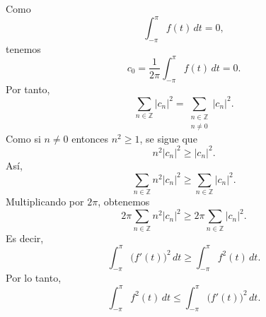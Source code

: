 \documentclass[11pt,letterpaper]{article}
\newcommand{\Z}{\mathbb{Z}}
\begin{document}
Como
\begin{equation*}
    \int_{-\pi}^{\pi}f(t)\,dt=0,
\end{equation*}
tenemos
\begin{equation*}
    c_0=\frac{1}{2\pi}\int_{-\pi}^{\pi}f(t)\,dt=0.
\end{equation*}
Por tanto,
\begin{equation*}
    \sum_{n\in\Z}|c_n|^2
    =\sum_{\substack{n\in\Z\\ n\neq0}}|c_n|^2.
\end{equation*}
Como si $n\neq0$ entonces $n^2\geq1$, se sigue que
\begin{equation*}
    n^2|c_n|^2\geq |c_n|^2.
\end{equation*}
Así,
\begin{equation*}
    \sum_{n\in\Z}n^2|c_n|^2
    \geq
    \sum_{n\in\Z}|c_n|^2.
\end{equation*}
Multiplicando por $2\pi$, obtenemos
\begin{equation*}
    2\pi\sum_{n\in\Z}n^2|c_n|^2
    \geq
    2\pi\sum_{n\in\Z}|c_n|^2.
\end{equation*}
Es decir,
\begin{equation*}
    \int_{-\pi}^{\pi}\bigl(f'(t)\bigr)^2\,dt
    \geq
    \int_{-\pi}^{\pi}f^2(t)\,dt.
\end{equation*}
Por lo tanto,
\begin{equation*}
    \int_{-\pi}^{\pi} f^2(t)\,dt
    \leq
    \int_{-\pi}^{\pi}\bigl(f'(t)\bigr)^2\,dt.
\end{equation*}
\end{document}
